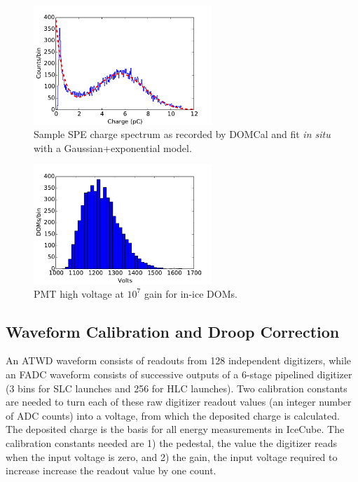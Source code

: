 \begin{figure}[!h]
 \centering
 \includegraphics[width=0.6\textwidth]{graphics/dom/domcal/hvfit.pdf}
 \caption{Sample SPE charge spectrum as recorded by DOMCal and fit
   \textit{in situ} with a Gaussian+exponential model.} 
 \label{fig:domcal_hvfit}
\end{figure}

\begin{figure}[!h]
 \centering
 \includegraphics[width=0.6\textwidth]{graphics/dom/domcal/inice_hv_2016.pdf}
 \caption{PMT high voltage at $10^7$ gain for in-ice DOMs.}
 \label{fig:domcal_hv_settings}
\end{figure}

\subsection{\label{sec:waveformcal} Waveform Calibration and Droop
  Correction}
An ATWD waveform consists of readouts from 128 independent digitizers,
while an FADC waveform consists of successive outputs of a 6-stage
pipelined digitizer (3 bins for SLC launches and 256 for HLC
launches). Two calibration constants are needed to turn each of these
raw digitizer readout values (an integer number of ADC counts) into a
voltage, from which the deposited charge is calculated. The deposited
charge is the basis for all energy measurements in IceCube. The
calibration constants needed are 1) the pedestal, the value the digitizer reads when the input voltage is zero, and
2) the gain, the input voltage required to increase increase the readout value by one count. 

